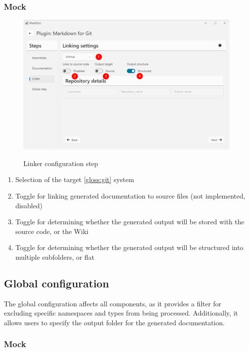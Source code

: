 \subsubsection{Mock}

\begin{figure}[H]
    \caption{Linker configuration step}
    \includegraphics[width=\linewidth]{img/pluginLinker.png}
    \label{fig:pluginLinker}
\end{figure}

\begin{enumerate}
    \item Selection of the target \ref{gloss:git} system
    \item Toggle for linking generated documentation to source files (not implemented, disabled)
    \item Toggle for determining whether the generated output will be stored with the source code, or the Wiki
    \item Toggle for determining whether the generated output will be structured into multiple subfolders, or flat
\end{enumerate}

\subsection{Global configuration}

The global configuration affects all components, as it provides a filter for excluding specific namespaces and types from being processed. Additionally, it allows users to specify the output folder for the generated documentation.

\subsubsection{Mock}

